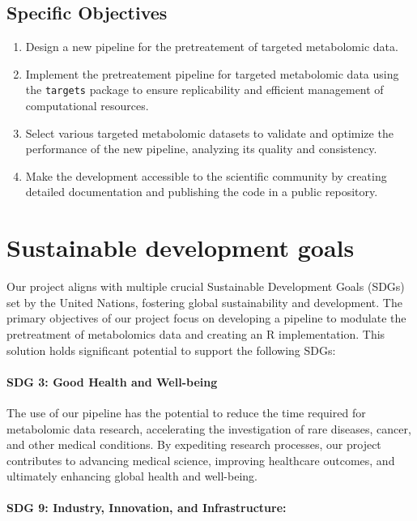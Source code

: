 \documentclass[ENG, BIB]{TFUOC}%
\begin{document}
\section{Specific Objectives}

\begin{enumerate}
    \item Design a new pipeline for the pretreatement of targeted metabolomic data.
    \item Implement the pretreatement pipeline for targeted metabolomic data using the \texttt{targets} package to ensure replicability and efficient management of computational resources.
    \item Select various targeted metabolomic datasets to validate and optimize the performance of the new pipeline, analyzing its quality and consistency.
    \item Make the development accessible to the scientific community by creating detailed documentation and publishing the code in a public repository.
\end{enumerate}


\chapter{Sustainable development goals}
\label{s:etic}

Our project aligns with multiple crucial Sustainable Development Goals (SDGs) set by the United Nations, fostering global sustainability and development. The primary objectives of our project focus on developing a pipeline to modulate the pretreatment of metabolomics data and creating an R implementation. This solution holds significant potential to support the following SDGs:

\subsubsection{SDG 3: Good Health and Well-being}

The use of our pipeline has the potential to reduce the time required for metabolomic data research, accelerating the investigation of rare diseases, cancer, and other medical conditions. By expediting research processes, our project contributes to advancing medical science, improving healthcare outcomes, and ultimately enhancing global health and well-being.

\subsubsection{SDG 9: Industry, Innovation, and Infrastructure:}
\end{document}

